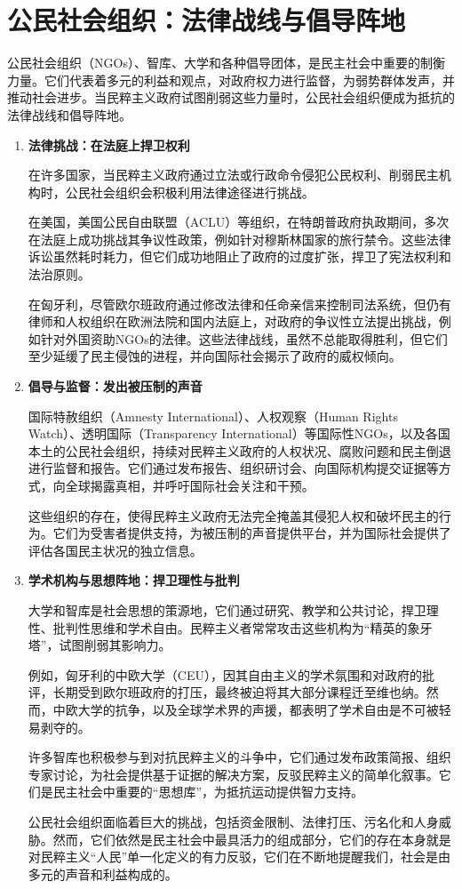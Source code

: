 \section{公民社会组织：法律战线与倡导阵地}

公民社会组织（NGOs）、智库、大学和各种倡导团体，是民主社会中重要的制衡力量。它们代表着多元的利益和观点，对政府权力进行监督，为弱势群体发声，并推动社会进步。当民粹主义政府试图削弱这些力量时，公民社会组织便成为抵抗的法律战线和倡导阵地。

\begin{enumerate}
    \item \textbf{法律挑战：在法庭上捍卫权利}

    在许多国家，当民粹主义政府通过立法或行政命令侵犯公民权利、削弱民主机构时，公民社会组织会积极利用法律途径进行挑战。

    在美国，美国公民自由联盟（ACLU）等组织，在特朗普政府执政期间，多次在法庭上成功挑战其争议性政策，例如针对穆斯林国家的旅行禁令。这些法律诉讼虽然耗时耗力，但它们成功地阻止了政府的过度扩张，捍卫了宪法权利和法治原则。

    在匈牙利，尽管欧尔班政府通过修改法律和任命亲信来控制司法系统，但仍有律师和人权组织在欧洲法院和国内法庭上，对政府的争议性立法提出挑战，例如针对外国资助NGOs的法律。这些法律战线，虽然不总能取得胜利，但它们至少延缓了民主侵蚀的进程，并向国际社会揭示了政府的威权倾向。

    \item \textbf{倡导与监督：发出被压制的声音}

    国际特赦组织（Amnesty International）、人权观察（Human Rights Watch）、透明国际（Transparency International）等国际性NGOs，以及各国本土的公民社会组织，持续对民粹主义政府的人权状况、腐败问题和民主倒退进行监督和报告。它们通过发布报告、组织研讨会、向国际机构提交证据等方式，向全球揭露真相，并呼吁国际社会关注和干预。

    这些组织的存在，使得民粹主义政府无法完全掩盖其侵犯人权和破坏民主的行为。它们为受害者提供支持，为被压制的声音提供平台，并为国际社会提供了评估各国民主状况的独立信息。

    \item \textbf{学术机构与思想阵地：捍卫理性与批判}

    大学和智库是社会思想的策源地，它们通过研究、教学和公共讨论，捍卫理性、批判性思维和学术自由。民粹主义者常常攻击这些机构为“精英的象牙塔”，试图削弱其影响力。

    例如，匈牙利的中欧大学（CEU），因其自由主义的学术氛围和对政府的批评，长期受到欧尔班政府的打压，最终被迫将其大部分课程迁至维也纳。然而，中欧大学的抗争，以及全球学术界的声援，都表明了学术自由是不可被轻易剥夺的。

    许多智库也积极参与到对抗民粹主义的斗争中，它们通过发布政策简报、组织专家讨论，为社会提供基于证据的解决方案，反驳民粹主义的简单化叙事。它们是民主社会中重要的“思想库”，为抵抗运动提供智力支持。

    公民社会组织面临着巨大的挑战，包括资金限制、法律打压、污名化和人身威胁。然而，它们依然是民主社会中最具活力的组成部分，它们的存在本身就是对民粹主义“人民”单一化定义的有力反驳，它们在不断地提醒我们，社会是由多元的声音和利益构成的。
\end{enumerate}

